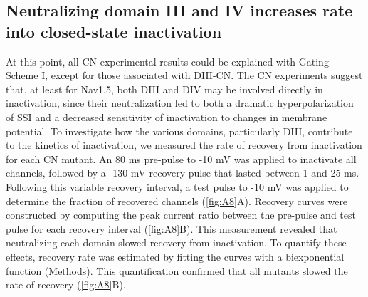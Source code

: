 \subsection{Neutralizing domain III and IV increases rate into closed-state inactivation}
At this point, all CN experimental results could be explained with Gating Scheme I, except for those associated with DIII-CN. The CN experiments suggest that, at least for Nav1.5, both DIII and DIV may be involved directly in inactivation, since their neutralization led to both a dramatic hyperpolarization of SSI and a decreased sensitivity of inactivation to changes in membrane potential. To investigate how the various domains, particularly DIII, contribute to the kinetics of inactivation, we measured the rate of recovery from inactivation for each CN mutant. An 80 ms pre-pulse to -10 mV was applied to inactivate all channels, followed by a -130 mV recovery pulse that lasted between 1 and 25 ms. Following this variable recovery interval, a test pulse to -10 mV was applied to determine the fraction of recovered channels (\autoref{fig:A8}A). Recovery curves were constructed by computing the peak current ratio between the pre-pulse and test pulse for each recovery interval (\autoref{fig:A8}B). This measurement revealed that neutralizing each domain slowed recovery from inactivation. To quantify these effects, recovery rate was estimated by fitting the curves with a biexponential function (Methods). This quantification confirmed that all mutants slowed the rate of recovery (\autoref{fig:A8}B).

